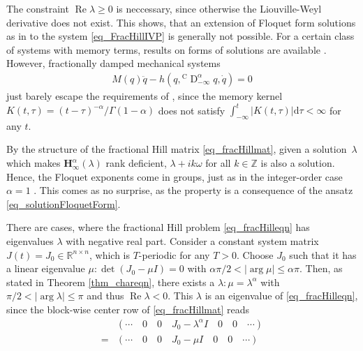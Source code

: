 \documentclass{svproc}
\newcommand{\realnumbers}{\mathbb{R}}
\newcommand{\dsomething}[1]{\mathrm{d}#1}
\newcommand{\CderivativeInput}[2]{{}^\mathrm{C}\operatorname{D}_{#2}^{#1}}
\newcommand{\hMat}{\mathbf H}
\begin{document}
{{		The constraint $\operatorname{Re} \lambda \geq 0$ is neccessary, since otherwise the Liouville-Weyl derivative does not exist. {This shows, that an extension of Floquet form solutions as in \cite{Traversa2020} to the system \eqref{eq_FracHillIVP} is generally not possible.} For a certain class of systems with memory terms, results on forms of solutions are available \cite{Traversa2020}. However, fractionally damped mechanical systems~\cite{Hinze2020}
		\begin{align}
			M(q)\ddot q - h\left(q,\CderivativeInput{\alpha}{-\infty}q,\dot q\right) = 0
		\end{align}
		just barely escape the requirements of \cite{Traversa2020}, since the memory kernel $K(t,\tau) = (t-\tau)^{-\alpha}/\Gamma(1-\alpha)$ does not satisfy $\int_{-\infty}^{t}|K(t,\tau)|\dsomething{\tau}<\infty$ for any $t$.
	\begin{remark}\label{rem_GroupOfLambda}
		By the structure of the fractional Hill matrix \eqref{eq_fracHillmat}, given a solution~$\lambda$ which makes $\hMat_\infty^\alpha(\lambda)$ rank deficient, $\lambda + ik\omega$ for all $k \in \mathbb{Z}$ is also a solution. Hence, the Floquet exponents come in groups, just as in the integer-order case $\alpha = 1$ \cite{Bayer2023a}. This comes as no surprise, as the property is a consequence of the ansatz \eqref{eq_solutionFloquetForm}.
	\end{remark}}
	\begin{remark} \label{rmk_negativeFloquetExponents}
		There are cases, where the fractional Hill problem \eqref{eq_fracHilleqn} has eigenvalues $\lambda$ with negative real part. Consider a constant system matrix $J(t) = J_0 \in \realnumbers^{n\times n}$, which is $T$-periodic for any $T>0$. Choose $J_0$ such that it has a linear eigenvalue $\mu: \det(J_0-\mu I) = 0$ with $\alpha \pi /2<|\arg \mu| \leq \alpha \pi$. Then, as stated in Theorem \ref{thm_chareqn}, there exists a $\lambda:\mu = \lambda^\alpha$ with $\pi /2<|\arg \lambda| \leq \pi$ and thus $\operatorname{Re}\lambda <0$. This $\lambda$ is an eigenvalue of \eqref{eq_fracHilleqn}, since the block-wise center row of \eqref{eq_fracHillmat} reads
		\begin{align}
			&\left(\cdots \quad 0 \quad 0 \quad J_0 -\lambda^\alpha I\quad 0\quad 0\quad \cdots\right)\\
			= &\left(\cdots \quad 0 \quad 0 \quad J_0 -\mu I\quad 0\quad 0\quad \cdots\right)

\end{align}
\end{remark}}
\end{document}

